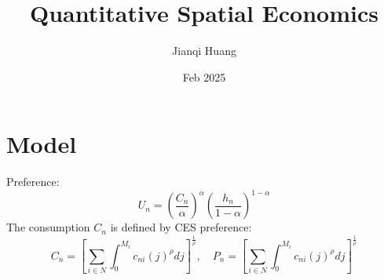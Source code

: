 \documentclass[11pt,a4paper]{article}
\begin{document}
\author{Jianqi Huang}
\title{Quantitative Spatial Economics}
\date{Feb 2025}
\maketitle

\section{Model}
Preference: 
\begin{equation}
    U_n = \left( \frac{C_n}{\alpha } \right)^{\alpha } \left( \frac{h_n}{1-\alpha } \right)^{1-\alpha }
\end{equation}
The consumption $C_n$ is defined by CES preference:
\begin{equation}
    C_n = \left[ \sum_{i \in N} \int_{0}^{M_i} c_{ni}(j)^\rho d j\right]^{\frac{1}{\rho}},\quad P_n = \left[ \sum_{i \in N} \int_{0}^{M_i} c_{ni}(j)^\rho d j\right]^{\frac{1}{\rho}}
\end{equation}
\end{document}
